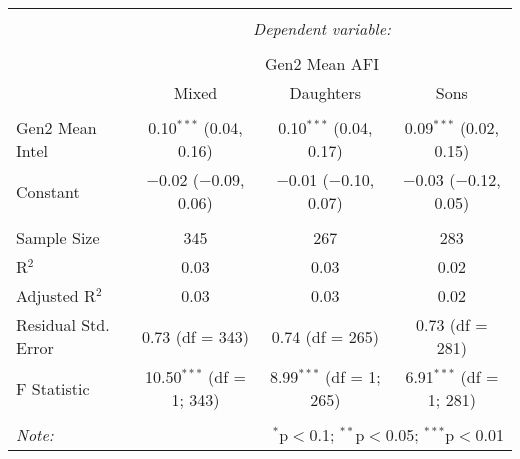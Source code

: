 
\begingroup 
\small 
\begin{tabular}{@{\extracolsep{1pt}}lccc} 
\\[-1.8ex]\hline 
\hline \\[-1.8ex] 
 & \multicolumn{3}{c}{\textit{Dependent variable:}} \\ 
\cline{2-4} 
\\[-1.8ex] & \multicolumn{3}{c}{Gen2 Mean AFI} \\ 
 & Mixed & Daughters & Sons \\ 
\hline \\[-1.8ex] 
 Gen2 Mean Intel & 0.10$^{***}$ (0.04, 0.16) & 0.10$^{***}$ (0.04, 0.17) & 0.09$^{***}$ (0.02, 0.15) \\ 
  Constant & $-$0.02 ($-$0.09, 0.06) & $-$0.01 ($-$0.10, 0.07) & $-$0.03 ($-$0.12, 0.05) \\ 
 \hline \\[-1.8ex] 
Sample Size & 345 & 267 & 283 \\ 
R$^{2}$ & 0.03 & 0.03 & 0.02 \\ 
Adjusted R$^{2}$ & 0.03 & 0.03 & 0.02 \\ 
Residual Std. Error & 0.73 (df = 343) & 0.74 (df = 265) & 0.73 (df = 281) \\ 
F Statistic & 10.50$^{***}$ (df = 1; 343) & 8.99$^{***}$ (df = 1; 265) & 6.91$^{***}$ (df = 1; 281) \\ 
\hline 
\hline \\[-1.8ex] 
\textit{Note:}  & \multicolumn{3}{r}{$^{*}$p$<$0.1; $^{**}$p$<$0.05; $^{***}$p$<$0.01} \\ 
\end{tabular} 
\endgroup 

